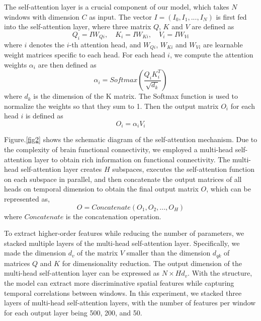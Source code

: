 \documentclass[journal,twoside,web]{ieeecolor}
\begin{document}
The self-attention layer is a crucial component of our model, which takes $N$ windows with dimension $C$ as input. The vector $I = (I_0, I_1,..., I_N)$ is first fed into the self-attention layer, where three matrix $Q$, $K$ and $V$ are defined as
\begin{equation}
	Q_i = I W_{Qi}, \quad K_i = I W_{Ki}, \quad V_i = I W_{Vi}
\end{equation}
where $i$ denotes the $i$-th attention head, and $W_{Qi}$, $W_{Ki}$ and $W_{Vi}$ are learnable weight matrices specific to each head. For each head $i$, we compute the attention weights $\alpha_i$ are then defined as
\begin{equation}
	\alpha_i = Softmax(\frac{Q_iK_i^T}{\sqrt{d_k}})
\end{equation}
where $d_k$ is the dimension of the K matrix. The Softmax function is used to normalize the weights so that they sum to 1. Then the output matrix $O_i$ for each head $i$ is defined as
\begin{equation}
	O_i = \alpha_i V_i
\end{equation}

Figure.\ref{fig2} shows the schematic diagram of the self-attention mechanism.  Due to the complexity of brain functional connectivity, we employed a multi-head self-attention layer to obtain rich information on functional connectivity. The multi-head self-attention layer creates $H$ subspaces, executes the self-attention function on each subspace in parallel, and then concatenate the output matrices of all heads on temporal dimension to obtain the final output matrix $O$, which can be represented as,
\begin{equation}
	O = Concatenate(O_1, O_2,..., O_H)
\end{equation}
where $Concatenate$ is the concatenation operation.

To extract higher-order features while reducing the number of parameters, we stacked multiple layers of the multi-head self-attention layer. Specifically, we made the dimension $d_v$ of the matrix $V$ smaller than the dimension $d_{qk}$ of matrices $Q$ and $K$ for dimensionality reduction. The output dimension of the multi-head self-attention layer can be expressed as $N\times Hd_v$. With the structure, the model can extract more discriminative spatial features while capturing temporal correlations between windows. In this experiment, we stacked three layers of multi-head self-attention layers, with the number of features per window for each output layer being 500, 200, and 50.
\end{document}
